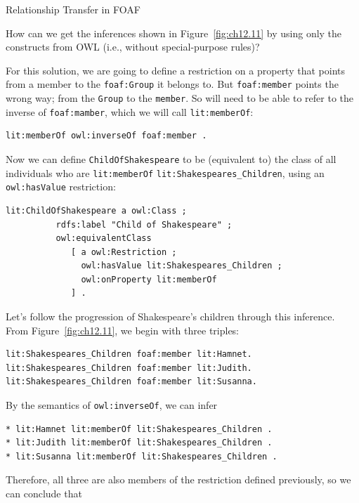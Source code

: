 \begin{challenge}{Relationship Transfer in FOAF}
\label{chal:26}

How can we get the inferences shown in Figure~\ref{fig:ch12.11} by using only the
constructs from OWL (i.e., without special-purpose rules)?

\solution

For this solution, we are going to define a restriction on a property that points from a member to the \texttt{foaf:Group} it belongs to.  But \texttt{foaf:member} points the wrong way; from the \texttt{Group} to 
the \texttt{member}.  So 
will need to be able to refer to the inverse of \texttt{foaf:mamber}, which we will call \texttt{lit:memberOf}:

\begin{lstlisting}
lit:memberOf owl:inverseOf foaf:member .
\end{lstlisting}

Now we can define \texttt{ChildOfShakespeare} to be (equivalent to) the class of
all individuals who are
\texttt{lit:memberOf} \texttt{lit:Shakespeares\_Children}, using an \texttt{owl:hasValue} restriction:

\begin{lstlisting}
lit:ChildOfShakespeare a owl:Class ;
          rdfs:label "Child of Shakespeare" ;
          owl:equivalentClass
             [ a owl:Restriction ;
               owl:hasValue lit:Shakespeares_Children ;
               owl:onProperty lit:memberOf
             ] .
\end{lstlisting}

Let's follow the progression of Shakespeare's children through this
inference. From Figure~\ref{fig:ch12.11}, we begin with three triples:

\begin{lstlisting}
lit:Shakespeares_Children foaf:member lit:Hamnet.
lit:Shakespeares_Children foaf:member lit:Judith.
lit:Shakespeares_Children foaf:member lit:Susanna.
\end{lstlisting}

By the semantics of \texttt{owl:inverseOf}, we can infer

\begin{lstlisting}
* lit:Hamnet lit:memberOf lit:Shakespeares_Children .
* lit:Judith lit:memberOf lit:Shakespeares_Children .
* lit:Susanna lit:memberOf lit:Shakespeares_Children .
\end{lstlisting}

Therefore, all three are also members of the restriction defined
previously, so we can conclude that


\end{challenge}
